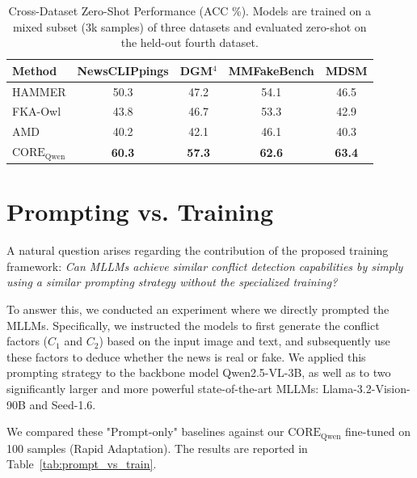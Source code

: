 \documentclass{article}
\theoremstyle{plain}
\theoremstyle{definition}
\theoremstyle{remark}
\begin{document}
\begin{table}[h]
\centering
\setlength{\tabcolsep}{4pt} 
\caption{
Cross-Dataset Zero-Shot Performance (ACC \%). Models are trained on a mixed subset (3k samples) of three datasets and evaluated zero-shot on the held-out fourth dataset.
}
\begin{tabular}{l cccc}
\toprule
\textbf{Method} & \textbf{NewsCLIPpings} & \textbf{DGM$^4$} & \textbf{MMFakeBench} & \textbf{MDSM} \\
\midrule

HAMMER & 50.3 & 47.2 & 54.1 & 46.5 \\
\midrule 
FKA-Owl & 43.8 & 46.7 & 53.3 & 42.9 \\
AMD & 40.2 & 42.1 & 46.1 & 40.3 \\
\midrule 

\rowcolor{LightGreen}
\textbf{$\text{CORE}_\text{Qwen}$} & \textbf{60.3} & \textbf{57.3} & \textbf{62.6} & \textbf{63.4} \\
\bottomrule
\end{tabular}
\small
\label{tab:cross_dataset_results}
\vspace{-0.5cm}
\end{table}

\section{Prompting vs. Training}
\label{sec:prompt_vs_training}

A natural question arises regarding the contribution of the proposed training framework: \textit{Can MLLMs achieve similar conflict detection capabilities by simply using a similar prompting strategy without the specialized training?} 

To answer this, we conducted an experiment where we directly prompted the MLLMs. Specifically, we instructed the models to first generate the conflict factors ($C_1$ and $C_2$) based on the input image and text, and subsequently use these factors to deduce whether the news is real or fake. We applied this prompting strategy to the backbone model Qwen2.5-VL-3B, as well as to two significantly larger and more powerful state-of-the-art MLLMs: Llama-3.2-Vision-90B and Seed-1.6.

We compared these "Prompt-only" baselines against our $\text{CORE}_\text{Qwen}$ fine-tuned on 100 samples (Rapid Adaptation). The results are reported in Table~\ref{tab:prompt_vs_train}.
\end{document}
